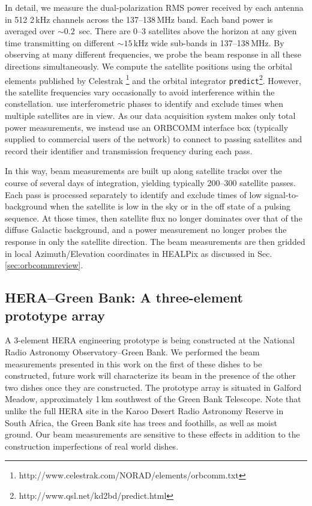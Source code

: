 \documentclass{emulateapj}
\begin{document}
In detail, we measure the dual-polarization RMS power received by each antenna in 512 2\,kHz 
channels across the 137--138\,MHz band. Each band power is averaged over $\sim0.2$
\,sec. There are 0--3 satellites above the horizon at any given time transmitting on different 
$\sim15$\,kHz wide sub-bands in 137--138\,MHz. By observing at many different 
frequencies, we probe the beam response in all these directions simultaneously. We 
compute the satellite positions using the orbital elements published by Celestrak
\footnote{http://www.celestrak.com/NORAD/elements/orbcomm.txt} and the orbital 
integrator \texttt{predict}\footnote{http://www.qsl.net/kd2bd/predict.html}. However, the 
satellite frequencies vary occasionally to avoid interference within the constellation. 
\citet{zheng14} use interferometric phases to identify and exclude times when multiple 
satellites are in view. As our data acquisition system makes only total power 
measurements, we instead use an ORBCOMM interface box (typically supplied to 
commercial users of the network) to connect to passing satellites and record their identifier 
and transmission frequency during each pass.

In this way, beam measurements are built up along satellite tracks over the course of 
several days of integration, yielding typically 200--300 satellite passes. Each pass is 
processed separately to identify and exclude times of low signal-to-background when the 
satellite is low in the sky or in the off state of a pulsing sequence. At those times, then 
satellite flux no longer dominates over that of the diffuse Galactic background, and a 
power measurement no longer probes the response in only the satellite direction. The beam 
measurements are then gridded in local Azimuth/Elevation coordinates in HEALPix \citep{healpix} as discussed in Sec. \ref{sec:orbcommreview}.


\subsection{HERA--Green Bank: A three-element prototype array}

A 3-element HERA engineering prototype is being constructed at the National Radio 
Astronomy Observatory--Green Bank. We performed the beam measurements presented in 
this work on the first of these dishes to be constructed, future work will characterize its beam in the presence of the other two dishes once they are constructed. The prototype array is situated in Galford Meadow, approximately 1\,km southwest of the Green Bank Telescope. Note that unlike the full HERA site in the Karoo Desert Radio Astronomy Reserve in 
South Africa, the Green Bank site has trees and foothills, as well as moist ground. Our beam measurements
are sensitive to these effects in addition to the construction imperfections of real world dishes.
\end{document}
